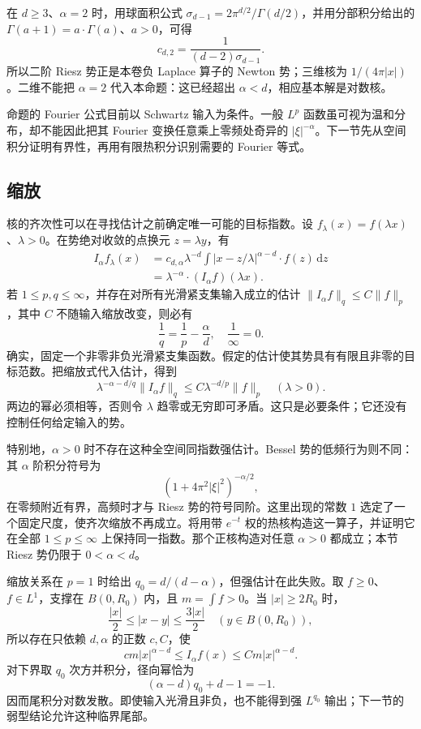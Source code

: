 在 \(d\geq3\)、\(\alpha=2\) 时，用球面积公式 \(\sigma_{d-1}=2\pi^{d/2}/\Gamma(d/2)\)，并用分部积分给出的 \(\Gamma(a+1)=a\cdot\Gamma(a)\)、\(a>0\)，可得
\[
 c_{d,2}=\frac1{(d-2)\sigma_{d-1}}.
\]
所以二阶 Riesz 势正是本卷负 Laplace 算子的 Newton 势；三维核为 \(1/(4\pi|x|)\)。二维不能把 \(\alpha=2\) 代入本命题：这已经超出 \(\alpha<d\)，相应基本解是对数核。

\ProseParagraphBreak

命题的 Fourier 公式目前以 Schwartz 输入为条件。一般 \(L^p\) 函数虽可视为温和分布，却不能因此把其 Fourier 变换任意乘上零频处奇异的 \(|\xi|^{-\alpha}\)。下一节先从空间积分证明有界性，再用有限热积分识别需要的 Fourier 等式。

\subsection{缩放}
\label{b2:subsec:190102}

核的齐次性可以在寻找估计之前确定唯一可能的目标指数。设 \(f_\lambda(x)=f(\lambda x)\)、\(\lambda>0\)。在势绝对收敛的点换元 \(z=\lambda y\)，有
\[
 \begin{aligned}
 I_\alpha f_\lambda(x)
 &=c_{d,\alpha}\lambda^{-d}
   \int|x-z/\lambda|^{\alpha-d}\cdot f(z)\,\mathrm dz\\
 &=\lambda^{-\alpha}\cdot(I_\alpha f)(\lambda x).
 \end{aligned}
\]
若 \(1\leq p,q\leq\infty\)，并存在对所有光滑紧支集输入成立的估计
\(\|I_\alpha f\|_q\leq C\|f\|_p\)，其中 \(C\) 不随输入缩放改变，则必有
\[
 \frac1q=\frac1p-\frac\alpha d,
 \quad\frac1\infty=0.
\]
确实，固定一个非零非负光滑紧支集函数。假定的估计使其势具有有限且非零的目标范数。把缩放式代入估计，得到
\[
 \lambda^{-\alpha-d/q}\|I_\alpha f\|_q
 \leq C\lambda^{-d/p}\|f\|_p\quad(\lambda>0).
\]
两边的幂必须相等，否则令 \(\lambda\) 趋零或无穷即可矛盾。这只是必要条件；它还没有控制任何给定输入的势。

\ProseParagraphBreak

特别地，\(\alpha>0\) 时不存在这种全空间同指数强估计。Bessel 势的低频行为则不同：其 \(\alpha\) 阶积分符号为
\[
 (1+4\pi^2|\xi|^2)^{-\alpha/2},
\]
在零频附近有界，高频时才与 Riesz 势的符号同阶。这里出现的常数 \(1\) 选定了一个固定尺度，使齐次缩放不再成立。将用带 \(e^{-t}\) 权的热核构造这一算子，并证明它在全部 \(1\leq p\leq\infty\) 上保持同一指数。那个正核构造对任意 \(\alpha>0\) 都成立；本节 Riesz 势仍限于 \(0<\alpha<d\)。

\ProseParagraphBreak

缩放关系在 \(p=1\) 时给出 \(q_0=d/(d-\alpha)\)，但强估计在此失败。取 \(f\geq0\)、\(f\in L^1\)，支撑在 \(B(0,R_0)\) 内，且 \(m=\int f>0\)。当 \(|x|\geq2R_0\) 时，
\[
 \frac{|x|}{2}\leq|x-y|\leq\frac{3|x|}{2}
 \quad(y\in B(0,R_0)),
\]
所以存在只依赖 \(d,\alpha\) 的正数 \(c,C\)，使
\[
 cm|x|^{\alpha-d}\leq I_\alpha f(x)
 \leq Cm|x|^{\alpha-d}.
\]
对下界取 \(q_0\) 次方并积分，径向幂恰为
\[
 (\alpha-d)q_0+d-1=-1.
\]
因而尾积分对数发散。即使输入光滑且非负，也不能得到强 \(L^{q_0}\) 输出；下一节的弱型结论允许这种临界尾部。

